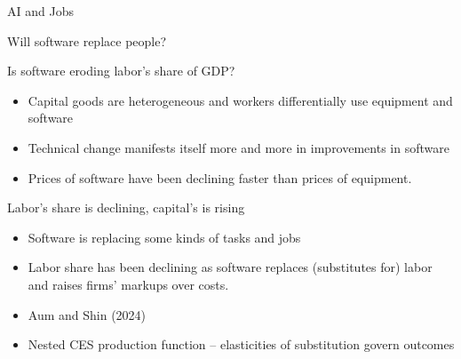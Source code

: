 \documentclass[aspectratio=169]{beamer}
\theoremstyle{Definition}
\begin{document}
\begin{frame}{AI and Jobs}
\
\bigskip

Will  software replace people?
\end{frame}


\begin{frame}{Is  software eroding labor's share of GDP?}

\begin{itemize}
\item Capital goods are heterogeneous and workers differentially use equipment and software
\item Technical change manifests itself more and more in improvements in software 
\item Prices of software have been declining faster than prices  of equipment.
\end{itemize}

\end{frame}
%
%
%


\begin{frame}{Labor's share is declining, capital's  is rising}

\begin{itemize}
\item Software is replacing some kinds of tasks and jobs 
\item
Labor share has been declining as software replaces (substitutes  for)  labor and raises firms' markups over costs.
\item Aum and Shin (2024)
\item Nested CES production function -- elasticities of substitution govern outcomes

\end{itemize}

\end{frame}
\end{document}
